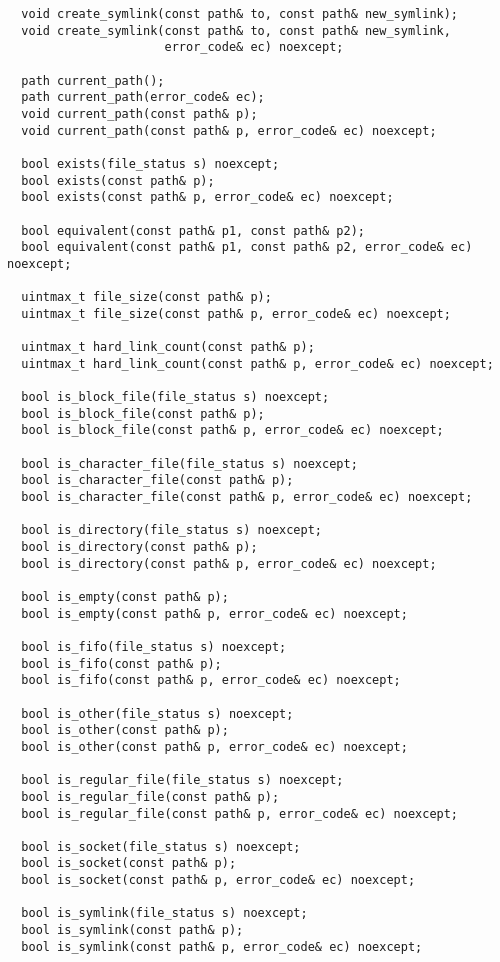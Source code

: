 \begin{verbatim}
  void create_symlink(const path& to, const path& new_symlink);
  void create_symlink(const path& to, const path& new_symlink,
                      error_code& ec) noexcept;

  path current_path();
  path current_path(error_code& ec);
  void current_path(const path& p);
  void current_path(const path& p, error_code& ec) noexcept;

  bool exists(file_status s) noexcept;
  bool exists(const path& p);
  bool exists(const path& p, error_code& ec) noexcept;

  bool equivalent(const path& p1, const path& p2);
  bool equivalent(const path& p1, const path& p2, error_code& ec) noexcept;

  uintmax_t file_size(const path& p);
  uintmax_t file_size(const path& p, error_code& ec) noexcept;

  uintmax_t hard_link_count(const path& p);
  uintmax_t hard_link_count(const path& p, error_code& ec) noexcept;

  bool is_block_file(file_status s) noexcept;
  bool is_block_file(const path& p);
  bool is_block_file(const path& p, error_code& ec) noexcept;

  bool is_character_file(file_status s) noexcept;
  bool is_character_file(const path& p);
  bool is_character_file(const path& p, error_code& ec) noexcept;

  bool is_directory(file_status s) noexcept;
  bool is_directory(const path& p);
  bool is_directory(const path& p, error_code& ec) noexcept;

  bool is_empty(const path& p);
  bool is_empty(const path& p, error_code& ec) noexcept;

  bool is_fifo(file_status s) noexcept;
  bool is_fifo(const path& p);
  bool is_fifo(const path& p, error_code& ec) noexcept;

  bool is_other(file_status s) noexcept;
  bool is_other(const path& p);
  bool is_other(const path& p, error_code& ec) noexcept;

  bool is_regular_file(file_status s) noexcept; 
  bool is_regular_file(const path& p);
  bool is_regular_file(const path& p, error_code& ec) noexcept;

  bool is_socket(file_status s) noexcept;
  bool is_socket(const path& p);
  bool is_socket(const path& p, error_code& ec) noexcept;

  bool is_symlink(file_status s) noexcept;
  bool is_symlink(const path& p);
  bool is_symlink(const path& p, error_code& ec) noexcept;


\end{verbatim}
